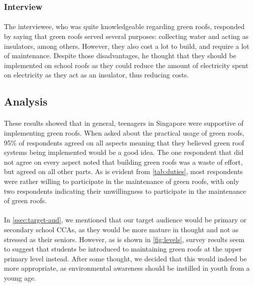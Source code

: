 \documentclass[a4paper]{article}
\begin{document}
\begin{multicols}{2}
  \subsubsection{Interview}
  \paragraph{} The interviewee, who was quite knowledgeable
  regarding green roofs, responded by saying that green roofs served
  several purposes: collecting water and acting as insulators, among
  others. However, they also cost a lot to build, and require a lot of
  maintenance. Despite those disadvantages, he thought that they should
  be implemented on school roofs as they could reduce the amount of
  electricity spent on electricity as they act as an insulator, thus
  reducing costs.



  \subsection{Analysis}
  \paragraph{} These results showed that in general, teenagers in
  Singapore were supportive of implementing green roofs. When asked
  about the practical usage of green roofs, 95\% of respondents agreed
  on all aspects meaning that they believed green roof systems being
  implemented would be a good idea. The one respondent that did not agree
  on every aspect noted that building green roofs was a waste of effort,
  but agreed on all other parts. As is evident from \cref{tab:duties},
  most respondents were rather willing to participate in the maintenance
  of green roofs, with only two respondents indicating their unwillingness
  to participate in the maintenance of green roofs.

  \paragraph{} In \cref{ssec:target-aud}, we mentioned that our target
  audience would be primary or secondary school CCAs, as they would be
  more mature in thought and not as stressed as their seniors. However,
  as is shown in \cref{fig:levels}, survey results seem to suggest that
  students be introduced to maintaining green roofs at the upper primary
  level instead. After some thought, we decided that this would indeed
  be more appropriate, as environmental awareness should be instilled
  in youth from a young age.


\end{multicols}
\end{document}
